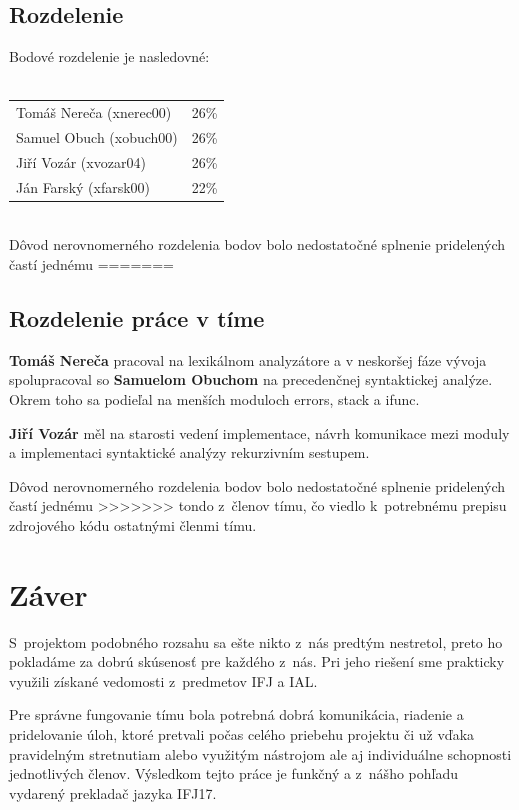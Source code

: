 \documentclass{article}
\begin{document}
\begin{itemize}
        \subsection{Rozdelenie}
        \noindent
        Bodové rozdelenie je nasledovné:\\~\\
        \begin{tabular}{l l}
            Tomáš Nereča (xnerec00) & 26\% \\
            Samuel Obuch (xobuch00) & 26\% \\
            Jiří Vozár (xvozar04)   & 26\% \\
            Ján Farský (xfarsk00)   & 22\% \\
        \end{tabular} \\
        Dôvod nerovnomerného rozdelenia bodov bolo nedostatočné splnenie pridelených častí jednému
=======
        \subsection{Rozdelenie práce v tíme}

        \textbf{Tomáš Nereča} pracoval na lexikálnom analyzátore a v neskoršej fáze vývoja spolupracoval so \textbf{Samuelom Obuchom} na 
        precedenčnej syntaktickej analýze. Okrem toho sa podieľal na menších moduloch errors, stack a ifunc. 

        \textbf{Jiří Vozár} měl na starosti vedení implementace, návrh komunikace mezi moduly a implementaci syntaktické analýzy rekurzivním sestupem.

        Dôvod nerovnomerného rozdelenia bodov bolo nedostatočné splnenie pridelených častí jednému 
>>>>>>> tondo
        z~členov tímu, čo viedlo k~potrebnému prepisu zdrojového kódu ostatnými členmi tímu.

    \section{Záver}
    S~projektom podobného rozsahu sa ešte nikto z~nás predtým nestretol, preto ho pokladáme za dobrú
    skúsenosť pre každého z~nás. Pri jeho riešení sme prakticky využili získané vedomosti z~predmetov
    IFJ a IAL.

    Pre správne fungovanie tímu bola potrebná dobrá komunikácia, riadenie a pridelovanie úloh, ktoré pretvali počas celého
    priebehu projektu či už vďaka pravidelným stretnutiam alebo využitým nástrojom ale aj individuálne
    schopnosti jednotlivých členov. Výsledkom tejto práce je funkčný a z~nášho pohľadu vydarený
    prekladač jazyka IFJ17.


\end{itemize}
\end{document}

